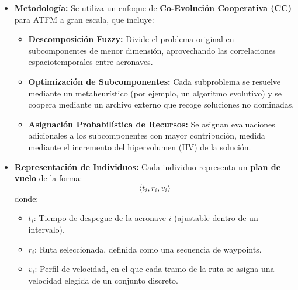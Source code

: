 \begin{frame}{\parencite{Guo_2024_CCDF} }{}
    \begin{itemize}
        \item \textbf{Metodología:}
              Se utiliza un enfoque de \textbf{Co-Evolución Cooperativa (CC)} para ATFM a gran escala, que incluye:
              \begin{itemize}
                  \item \textbf{Descomposición Fuzzy:} Divide el problema original en subcomponentes de menor dimensión, aprovechando las correlaciones espaciotemporales entre aeronaves.
                  \item \textbf{Optimización de Subcomponentes:} Cada subproblema se resuelve mediante un metaheurístico (por ejemplo, un algoritmo evolutivo) y se coopera mediante un archivo externo que recoge soluciones no dominadas.
                  \item \textbf{Asignación Probabilística de Recursos:} Se asignan evaluaciones adicionales a los subcomponentes con mayor contribución, medida mediante el incremento del hipervolumen (HV) de la solución.
              \end{itemize}
        \item \textbf{Representación de Individuos:}
              Cada individuo representa un \textbf{plan de vuelo} de la forma:
              \[
                  \langle t_i, r_i, v_i \rangle
              \]
              donde:
              \begin{itemize}
                  \item \(t_i\): Tiempo de despegue de la aeronave \(i\) (ajustable dentro de un intervalo).
                  \item \(r_i\): Ruta seleccionada, definida como una secuencia de waypoints.
                  \item \(v_i\): Perfil de velocidad, en el que cada tramo de la ruta se asigna una velocidad elegida de un conjunto discreto.
              \end{itemize}
    \end{itemize}
\end{frame}

